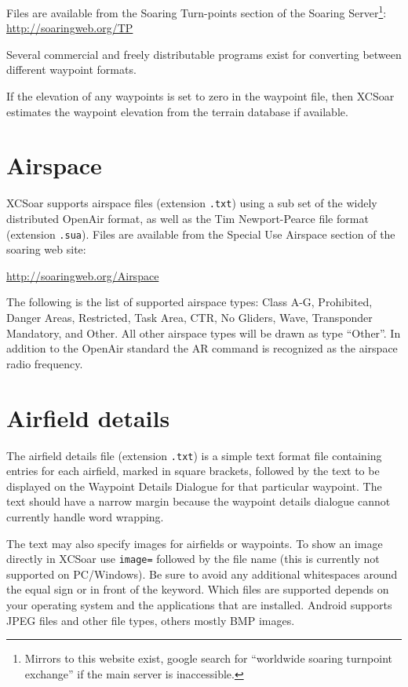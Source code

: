 Files are available from the Soaring Turn-points section of the
Soaring Server\footnote{Mirrors to this website exist, google search
for ``worldwide soaring turnpoint exchange'' if the main server is
inaccessible.}: \url{http://soaringweb.org/TP}

Several commercial and freely distributable programs exist for
converting between different waypoint formats.

If the elevation of any waypoints is set to zero in the waypoint file,
then XCSoar estimates the waypoint elevation from the terrain database
if available.

\section{Airspace}

XCSoar supports airspace files (extension \verb|.txt|) using a sub set
of the widely distributed OpenAir format, as well as the Tim Newport-Pearce file
format (extension \verb|.sua|). Files are available from the
Special Use Airspace section of the soaring web site:

\url{http://soaringweb.org/Airspace}

The following is the list of supported airspace types: Class A-G, Prohibited, 
Danger Areas, Restricted, Task Area, CTR, No Gliders, Wave, Transponder 
Mandatory, and Other.  All other airspace types will be drawn as type ``Other''.
In addition to the OpenAir standard the AR command is recognized as the 
airspace radio frequency.

\section{Airfield details}\label{sec:airfield-details}

The airfield details file (extension \verb|.txt|) is a simple text
format file containing entries for each airfield, marked in square
brackets, followed by the text to be displayed on the
Waypoint Details Dialogue for that particular waypoint.  The text should
have a narrow margin because the waypoint details dialogue cannot
currently handle word wrapping.

The text may also specify images for airfields or waypoints.  To
show an image directly in XCSoar use \verb|image=| followed by the file
name (this is currently not supported on PC/Windows).  Be sure
to avoid any additional whitespaces around the equal sign or in front of the
keyword. Which files are supported depends on your operating system and the
applications that are installed.  Android supports JPEG files and other
file types, others mostly BMP images.

